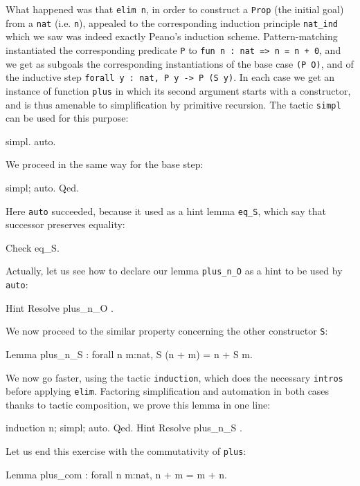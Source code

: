 \documentclass[11pt,a4paper]{book}
\begin{document}
What happened was that \texttt{elim n}, in order to construct a \texttt{Prop}
(the initial goal) from a \texttt{nat} (i.e. \texttt{n}), appealed to the
corresponding induction principle \texttt{nat\_ind} which we saw was indeed
exactly Peano's induction scheme. Pattern-matching instantiated the
corresponding predicate \texttt{P} to \texttt{fun n : nat => n = n + 0},
and we get as subgoals the corresponding instantiations of the base case
\texttt{(P O)}, and of the inductive step
\texttt{forall y : nat, P y -> P (S y)}.
In each case we get an instance of function \texttt{plus} in which its second
argument starts with a constructor, and is thus amenable to simplification
by primitive recursion. The \Coq{} tactic \texttt{simpl} can be used for
this purpose:
\begin{coq_example}
simpl.
auto.
\end{coq_example}

We proceed in the same way for the base step:
\begin{coq_example}
simpl; auto.
Qed.
\end{coq_example}

Here \verb:auto: succeeded, because it used as a hint lemma \verb:eq_S:,
which say that successor preserves equality:
\begin{coq_example}
Check eq_S.
\end{coq_example}

Actually, let us see how to declare our lemma \verb:plus_n_O: as a hint
to be used by \verb:auto::
\begin{coq_example}
Hint Resolve plus_n_O .
\end{coq_example}

We now proceed to the similar property concerning the other constructor
\verb:S::
\begin{coq_example}
Lemma plus_n_S : forall n m:nat, S (n + m) = n + S m.
\end{coq_example}

We now go faster, using the tactic \verb:induction:, which does the
necessary \verb:intros: before applying \verb:elim:. Factoring simplification
and automation in both cases thanks to tactic composition, we prove this
lemma in one line:
\begin{coq_example}
induction n; simpl; auto.
Qed.
Hint Resolve plus_n_S .
\end{coq_example}

Let us end this exercise with the commutativity of \verb:plus::

\begin{coq_example}
Lemma plus_com : forall n m:nat, n + m = m + n.
\end{coq_example}
\end{document}
